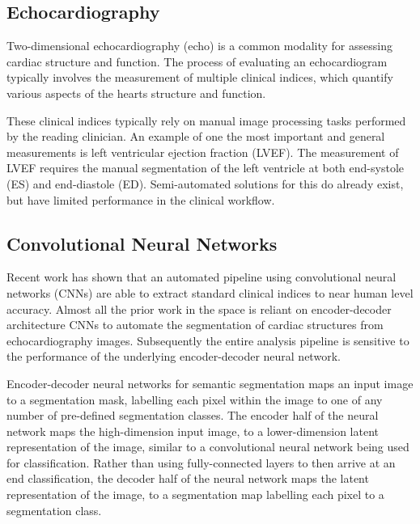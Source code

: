 \subsection{Echocardiography}
Two-dimensional echocardiography (echo) is a common modality for assessing cardiac
structure and function. The process of evaluating an echocardiogram typically involves the
measurement of multiple clinical indices, which quantify various aspects of the
hearts structure and function. \newline

These clinical indices typically rely on manual image processing tasks performed 
by the reading clinician. An example of one the most important and general measurements is
left ventricular ejection fraction (LVEF). The measurement of LVEF requires the
manual segmentation of the left ventricle at both end-systole (ES) and
end-diastole (ED). Semi-automated solutions for this do already exist, but have
limited performance in the clinical workflow. \newline

\subsection{Convolutional Neural Networks}

Recent work has shown that an automated pipeline using convolutional neural
networks (CNNs) are able to extract standard clinical indices to near human
level accuracy. Almost all the prior work in the space is reliant on
encoder-decoder architecture CNNs to automate the segmentation of cardiac
structures from echocardiography images. Subsequently the entire analysis
pipeline is sensitive to the performance of the underlying encoder-decoder neural
network. \newline

Encoder-decoder neural networks for semantic segmentation maps an input image to
a segmentation mask, labelling each pixel within the image to one of any number
of pre-defined segmentation classes. The encoder half of the neural network maps
the high-dimension input image, to a lower-dimension latent representation of
the image, similar to a convolutional neural network being used for
classification. Rather than using fully-connected layers to then arrive at an
end classification, the decoder half of the neural network maps the latent
representation of the image, to a segmentation map labelling each pixel to a
segmentation class. \newline

